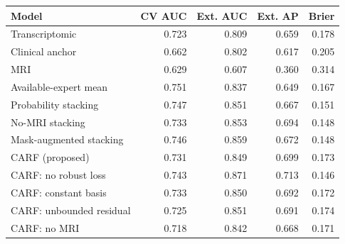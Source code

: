 \begin{tabular}{lrrrr}
\toprule
Model & CV AUC & Ext. AUC & Ext. AP & Brier\\
\midrule
Transcriptomic & 0.723 & 0.809 & 0.659 & 0.178\\
Clinical anchor & 0.662 & 0.802 & 0.617 & 0.205\\
MRI & 0.629 & 0.607 & 0.360 & 0.314\\
Available-expert mean & 0.751 & 0.837 & 0.649 & 0.167\\
Probability stacking & 0.747 & 0.851 & 0.667 & 0.151\\
No-MRI stacking & 0.733 & 0.853 & 0.694 & 0.148\\
Mask-augmented stacking & 0.746 & 0.859 & 0.672 & 0.148\\
CARF (proposed) & 0.731 & 0.849 & 0.699 & 0.173\\
CARF: no robust loss & 0.743 & 0.871 & 0.713 & 0.146\\
CARF: constant basis & 0.733 & 0.850 & 0.692 & 0.172\\
CARF: unbounded residual & 0.725 & 0.851 & 0.691 & 0.174\\
CARF: no MRI & 0.718 & 0.842 & 0.668 & 0.171\\
\bottomrule
\end{tabular}
